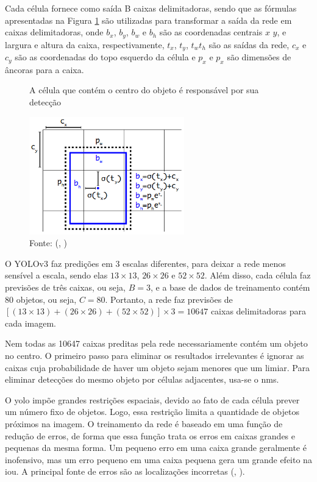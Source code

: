 \documentclass[]{politex}
\begin{document}
Cada célula fornece como saída B caixas delimitadoras, sendo que as fórmulas apresentadas na Figura \ref{fig:yolo_grid_formula} são utilizadas para transformar a saída da rede em caixas delimitadoras, onde \(b_x\), \(b_y\), \(b_w\) e \(b_h\) são as coordenadas centrais \(x\) \(y\), e largura e altura da caixa, respectivamente, \(t_x\), \(t_y\), \(t_w t_h\) são as saídas da rede, \(c_x\) e \(c_y\) são as coordenadas do topo esquerdo da célula e \(p_x\) e \(p_x\) são dimensões de âncoras para a caixa.

\begin{figure}[H]
    \caption{A célula que contém o centro do objeto é responsável por sua detecção}
    \centering
    \includegraphics[width=0.6\textwidth]{Bounding_box_dimension_and_location}
    \caption*{Fonte: (, \citeyear{yolov1})}
    \label{fig:yolo_grid_formula}
\end{figure}

O YOLOv3 faz predições em 3 escalas diferentes, para deixar a rede menos sensível a escala, sendo elas \(13\times 13\), \(26 \times 26\) e \(52 \times 52\). Além disso, cada célula faz previsões de três caixas, ou seja, \(B=3\), e a base de dados de treinamento contém 80 objetos, ou seja, \(C=80\). Portanto, a rede faz previsões de \([(13 \times 13) + (26 \times 26)+(52 \times 52)] \times 3=10647\) caixas delimitadoras para cada imagem.

Nem todas as 10647 caixas preditas pela rede necessariamente contém um objeto no centro. O primeiro passo para eliminar os resultados irrelevantes é ignorar as caixas cuja probabilidade de haver um objeto sejam menores que um limiar. Para eliminar detecções do mesmo objeto por células adjacentes, usa-se o \acrshort{nms}.

O \acrshort{yolo} impõe grandes restrições espaciais, devido ao fato de cada célula prever um número fixo de objetos. Logo, essa restrição limita a quantidade de objetos próximos na imagem. O treinamento da rede é baseado em uma função de redução de erros, de forma que essa função trata os erros em caixas grandes e pequenas da mesma forma. Um pequeno erro em uma caixa grande geralmente é inofensivo, mas um erro pequeno em uma caixa pequena gera um grande efeito na \acrshort{iou}. A principal fonte de erros são as localizações incorretas (, \citeyear{yolov1}).
\end{document}
